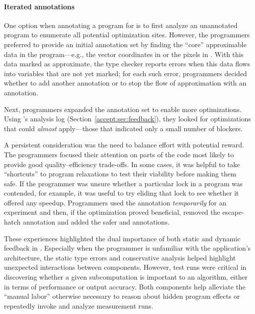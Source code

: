 \paragraph{Iterated annotations}
One option when annotating a program for \sysname is to first analyze an
unannotated program to enumerate all potential optimization sites.
However, the programmers preferred
to
provide an initial annotation set by finding the ``core''
approximable data in the program---e.g., the vector coordinates in
 or the pixels in . With this data marked as
approximate, the type
checker reports errors when this data flows into variables that are not yet
marked; for each such error, programmers decided whether to add another 
annotation or to stop the flow of approximation with an 
annotation.

Next, programmers expanded the annotation set to enable more optimizations.
Using \sysname's analysis log (Section~\ref{accept:sec:feedback}), they looked for
optimizations that could \emph{almost} apply---those that indicated only a
small number of blockers.

A persistent consideration was the need to balance effort with potential
reward.  The programmers focused their attention on parts of the code
most likely to provide good quality--efficiency trade-offs.
In some cases, it was helpful to take ``shortcuts'' to program relaxations to
test their viability before making them safe.
If the programmer was unsure whether a particular lock in a
program was contended, for example, it was useful to try eliding that lock to
see whether it offered any speedup.
Programmers used the \annpermit annotation
\emph{temporarily} for an experiment and then, if the optimization proved
beneficial, removed the escape-hatch annotation and added the safer
 and  annotations.

These experiences highlighted the dual importance of both static and dynamic
feedback in \sysname.
Especially when the programmer is unfamiliar with the application's
architecture, the static type errors and conservative \precisepurity analysis
helped highlight unexpected interactions between components.
However, test runs were critical in discovering whether a
given subcomputation is important to an algorithm, either in terms of
performance or output accuracy.
Both components help alleviate the ``manual labor'' otherwise necessary to
reason about hidden program effects or repeatedly invoke and analyze
measurement runs.

